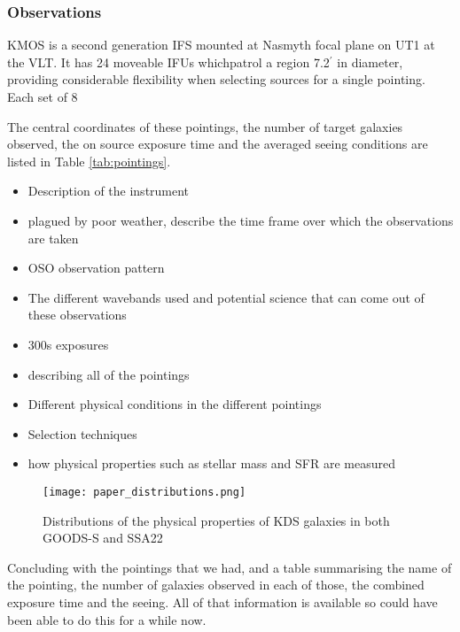 \documentclass[a4paper,fleqn,usenatbib]{mn2e}
\begin{document}
\subsubsection{Observations}\label{subsub:Obs}
KMOS is a second generation IFS mounted at Nasmyth focal plane on UT1 at the VLT.
It has 24 moveable IFUs whichpatrol a region 7.2$^{\prime}$ in diameter, providing considerable flexibility when selecting sources for a single pointing.
Each set of 8  

The central coordinates of these pointings, the number of target galaxies observed, the on source exposure time and the averaged seeing conditions are listed in Table \ref{tab:pointings}.



\begin{itemize}
    \item Description of the instrument 
    \item plagued by poor weather, describe the time frame over which the observations are taken
    \item OSO observation pattern
    \item The different wavebands used and potential science that can come out of these observations
    \item 300s exposures
    \item describing all of the pointings 
    \item Different physical conditions in the different pointings
    \item Selection techniques
    \item how physical properties such as stellar mass and SFR are measured
\end{itemize}

\begin{figure}
\centering
\texttt{[image: paper\_distributions.png]}
\caption{Distributions of the physical properties of KDS galaxies in both GOODS-S and SSA22}
\label{fig:distributions}
\end{figure}

Concluding with the pointings that we had, and a table summarising the name of the pointing, the number of galaxies observed in each of those, the combined exposure time and the seeing. All of that information is available so could have been able to do this for a while now.
\end{document}
